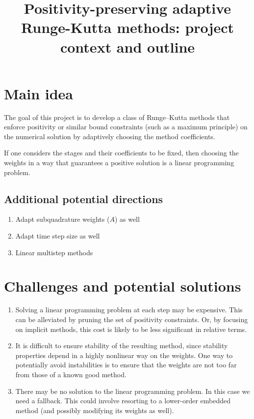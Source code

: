 \documentclass{article}
\title{Positivity-preserving adaptive Runge-Kutta methods: project context and outline}
\author{}
\begin{document}
\maketitle


\section{Main idea}

The goal of this project is to develop a class of Runge--Kutta methods that enforce positivity or similar bound constraints (such as a maximum principle) on the numerical solution by adaptively choosing the method coefficients.

If one considers the stages and their coefficients to be fixed,
then choosing the weights in a way that guarantees a positive
solution is a linear programming problem.

\subsection{Additional potential directions}
\begin{enumerate}
    \item Adapt subquadrature weights ($A$) as well
    \item Adapt time step size as well
    \item Linear multistep methods
\end{enumerate}

\section{Challenges and potential solutions}
\begin{enumerate}
    \item Solving a linear programming problem at each step may be expensive.  This can be alleviated by pruning the set of positivity constraints.  Or, by focusing on implicit methods,
    this cost is likely to be less significant in relative terms.
    \item It is difficult to ensure stability of the resulting method,
    since stability properties depend in a highly nonlinear way
    on the weights.  One way to potentially avoid instabilities is
    to ensure that the weights are not too far from those of a known
    good method.
    \item There may be no solution to the linear programming problem.
    In this case we need a fallback.  This could involve resorting
    to a lower-order embedded method (and possibly modifying its
    weights as well).
\end{enumerate}
\end{document}
